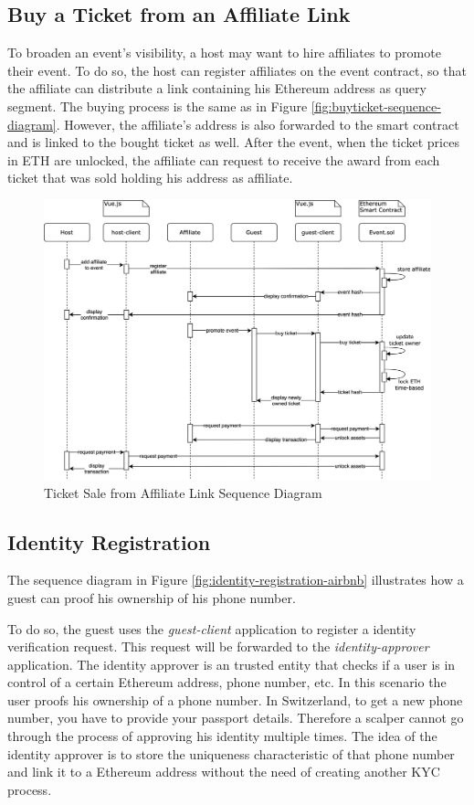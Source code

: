 \subsection{Buy a Ticket from an Affiliate Link}
To broaden an event's visibility, a host may want to hire affiliates to promote their event. To do so, the host can register affiliates on the event contract, so that the affiliate can distribute a link containing his Ethereum address as query segment. The buying process is the same as in Figure \ref{fig:buyticket-sequence-diagram}. However, the affiliate's address is also forwarded to the smart contract and is linked to the bought ticket as well. After the event, when the ticket prices in ETH are unlocked, the affiliate can request to receive the award from each ticket that was sold holding his address as affiliate.
\begin{figure}[H]
    \centering
    \includegraphics[width=16cm]{design/diagrams/BuyTicketFromAffiliateLink.png}
    \caption{Ticket Sale from Affiliate Link Sequence Diagram}
    \label{fig:buyticket-from-affiliate-diagram}
\end{figure}

\subsection{Identity Registration}
The sequence diagram in Figure \ref{fig:identity-registration-airbnb} illustrates how a guest can proof his ownership of his phone number.

To do so, the guest uses the \textit{guest-client} application to register a identity verification request. This request will be forwarded to the \textit{identity-approver} application. The identity approver is an trusted entity that checks if a user is in control of a certain Ethereum address, phone number, etc. In this scenario the user proofs his ownership of a phone number. In Switzerland, to get a new phone number, you have to provide your passport details. Therefore a scalper cannot go through the process of approving his identity multiple times. The idea of the identity approver is to store the uniqueness characteristic of that phone number and link it to a Ethereum address without the need of creating another KYC process. 

